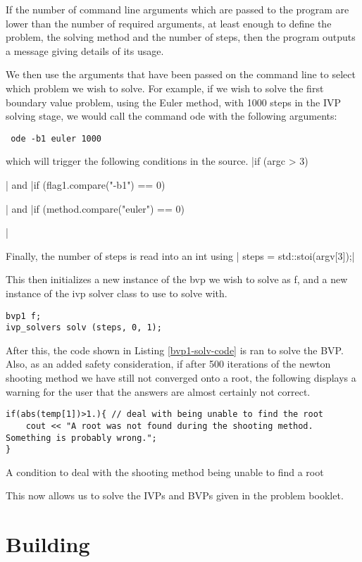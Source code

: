 \documentclass[a4paper,11pt]{report}
\begin{document}
If the number of command line arguments which are passed to the program are lower than the number of required arguments, at least enough to define the problem, the solving method and the number of steps, then the program outputs a message giving details of its usage.

We then use the arguments that have been passed on the command line to select which problem we wish to solve. For example, if we wish to solve the first boundary value problem, using the Euler method, with 1000 steps in the IVP solving stage, we would call the command ode with the following arguments:
\begin{verbatim} ode -b1 euler 1000 \end{verbatim}
which will trigger the following conditions in the source.
|if (argc > 3){|
and
|if (flag1.compare("-b1") == 0){|
and
|if (method.compare("euler") == 0){|

Finally, the number of steps is read into an int using
|	steps = std::stoi(argv[3]);|

This then initializes a new instance of the bvp we wish to solve as f, and a new instance of the ivp solver class to use to solve with.
\begin{verbatim}
bvp1 f;
ivp_solvers solv (steps, 0, 1);
\end{verbatim}

After this, the code shown in Listing \ref{bvp1-solv-code} is ran to solve the BVP. Also, as an added safety consideration, if after 500 iterations of the newton shooting method we have still not converged onto a root, the following displays a warning for the user that the answers are almost certainly not correct.

\begin{listing}
\begin{verbatim}
if(abs(temp[1])>1.){ // deal with being unable to find the root
	cout << "A root was not found during the shooting method. Something is probably wrong.";
}
\end{verbatim}
\caption{A condition to deal with the shooting method being unable to find a root}
\end{listing}

This now allows us to solve the IVPs and BVPs given in the problem booklet.

\section{Building}

}}}
\end{document}
